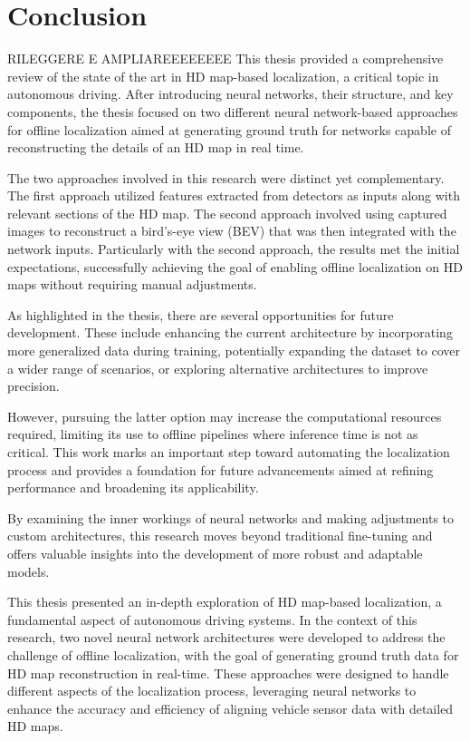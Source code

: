 \chapter*{Conclusion}

RILEGGERE E AMPLIAREEEEEEEE
This thesis provided a comprehensive review of the state of the art in HD map-based localization, a critical topic in autonomous driving. After introducing neural networks, their structure, and key components, the thesis focused on two different neural network-based approaches for offline localization aimed at generating ground truth for networks capable of reconstructing the details of an HD map in real time.

The two approaches involved in this research were distinct yet complementary. The first approach utilized features extracted from detectors as inputs along with relevant sections of the HD map. The second approach involved using captured images to reconstruct a bird's-eye view (BEV) that was then integrated with the network inputs. Particularly with the second approach, the results met the initial expectations, successfully achieving the goal of enabling offline localization on HD maps without requiring manual adjustments.

As highlighted in the thesis, there are several opportunities for future development. These include enhancing the current architecture by incorporating more generalized data during training, potentially expanding the dataset to cover a wider range of scenarios, or exploring alternative architectures to improve precision. 

However, pursuing the latter option may increase the computational resources required, limiting its use to offline pipelines where inference time is not as critical. This work marks an important step toward automating the localization process and provides a foundation for future advancements aimed at refining performance and broadening its applicability.

By examining the inner workings of neural networks and making adjustments to custom architectures, this research moves beyond traditional fine-tuning and offers valuable insights into the development of more robust and adaptable models.




This thesis presented an in-depth exploration of HD map-based localization, a fundamental aspect of autonomous driving systems. In the context of this research, two novel neural network architectures were developed to address the challenge of offline localization, with the goal of generating ground truth data for HD map reconstruction in real-time. These approaches were designed to handle different aspects of the localization process, leveraging neural networks to enhance the accuracy and efficiency of aligning vehicle sensor data with detailed HD maps.

